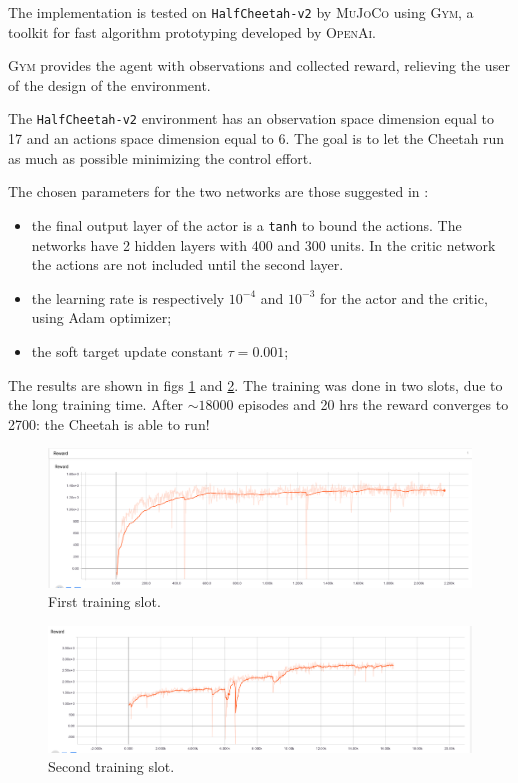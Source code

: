 \documentclass[10pt,a4paper]{scrartcl}
\begin{document}
The implementation is tested on \texttt{HalfCheetah-v2} by \textsc{MuJoCo} using \textsc{Gym}, a toolkit for fast algorithm prototyping developed by \textsc{OpenAi}.

\textsc{Gym} provides the agent with observations and collected reward, relieving the user of the design of the environment.

The \texttt{HalfCheetah-v2} environment has an observation space dimension equal to 17 and an actions space dimension equal to 6. The goal is to let the Cheetah run as much as possible minimizing the control effort.

The chosen parameters for the two networks are those suggested in \cite{lillicrap2015continuous}:
\begin{itemize}
	\item the final output layer of the actor is a \texttt{tanh} to bound the actions. The networks have 2 hidden layers with 400 and 300 units. In the critic network the actions are not included until the second layer.
	\item the learning rate is respectively $ 10^{-4} $ and $ 10^{-3} $ for the actor and the critic, using Adam optimizer;
	\item the soft target update constant $ \tau = 0.001 $;
\end{itemize}

The results are shown in figs \ref{fig:cheetahrew1} and \ref{fig:cheetahrew2}. The training was done in two slots, due to the long training time. After $ \sim 18000 $ episodes and 20 hrs the reward converges to 2700: the Cheetah is able to run!

\begin{figure}[h]
	\centering
	\includegraphics[width=1.0\linewidth]{images/cheetah_rew1}
	\caption{First training slot.}
	\label{fig:cheetahrew1}
\end{figure}
\begin{figure}[h]
	\centering
	\includegraphics[width=1.0\linewidth]{images/cheetah_rew2}
	\caption{Second training slot.}
	\label{fig:cheetahrew2}
\end{figure}
\end{document}
